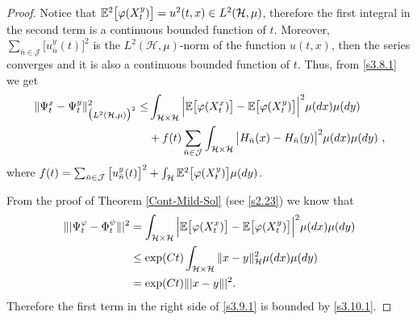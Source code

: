 \documentclass[review,onefignum,onetabnum]{siamart190516}
\begin{document}
\begin{proof}
    Notice that
$\mathbb{E}^2\big[\varphi(X_t^y)\big]=u^2(t,x)\in L^2(\mathcal{H},\mu)$,
therefore the first integral in the second term is a continuous bounded
function of $t$. Moreover,
$\sum_{\bar n\in \mathcal{J}} \big[u_{\bar n}^y(t)\big]^2$ is the
$L^2(\mathcal{H},\mu)$-norm of the function $u(t,x)$, then the series
converges and it is also a continuous bounded function of $t$. Thus, from
\eqref{s3.8.1} we get
%
\begin{equation}
\label{s3.9.1}
    \begin{aligned}
        \| \Psi_t^x-\Psi_t^y\|_{\big(L^2(\mathcal{H},\mu) \big)^2}^2
        \le&
        \int_{\mathcal{H}\times \mathcal{H}}
            \Big|
                \E\big [
                    \varphi(X_t^x)
                \big
                ]-
                \E\big[
                    \varphi(X_t^y)
                \big]
            \Big|^2
        \mu(dx)\mu(dy)
        \\
         &+
         f(t)
         \sum_{\bar n\in \mathcal{J}}
         \int_{\mathcal{H}\times \mathcal{H}}
            \big|
                H_{\bar n}(x) - H_{\bar n}(y)
            \big|^2 \mu(dx)\mu(dy) \ ,
    \end{aligned}
\end{equation}
where $f(t)= \sum_{\bar n\in \mathcal{J}} \big[u_{\bar n}^y(t)\big]^2+ \int_\mathcal{H}
            \mathbb{E} ^ 2\big[
                \varphi(X_t^y)
            \big] \mu(dy)
            $.

From the proof of Theorem \ref{Cont-Mild-Sol} (see \eqref{s2.23}) we know that
\begin{equation}
    \begin{aligned}
        \| | \Psi_t^\varphi-\Phi_t^\psi\| |^2
            &=\int_{\mathcal{H}\times \mathcal{H}}
            \Big|
                \E\big [
                    \varphi(X_t^x)
                \big]
                -
                \E\big[
                    \varphi(X_t^y)
                \big]
            \Big|^2
            \mu(dx)
            \mu(dy)
            \\
            &\le
            \exp(Ct)
            \int_{\mathcal{H}\times \mathcal{H}}
                \|x-y\|_{\mathcal{H}}^2
                \mu(dx)\mu(dy)
            \\
            &= \exp(Ct) \|  |x-y\| |^2.\label{s3.10.1}
    \end{aligned}
\end{equation}
Therefore the first term in the right side of \eqref{s3.9.1} is bounded by
\eqref{s3.10.1}.


\end{proof}
\end{document}
